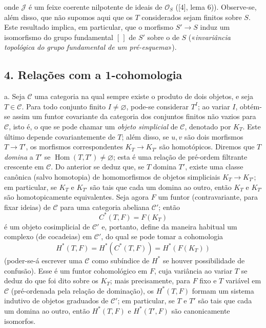 \documentclass[11pt,twoside,openany]{book}
\numberwithin{equation}{section}
\newcommand{\src}[1]{%
  \phantomsection\hypertarget{src:#1}{}%
  \marginpar{\raggedleft\footnotesize\sffamily #1}%
}
\theoremstyle{plain}
\theoremstyle{definition}
\theoremstyle{remark}
\newcommand{\FgaUnitKey}{frontmatter}
\renewcommand{\src}[1]{%
  \phantomsection\hypertarget{src:\FgaUnitKey:#1}{}%
  \marginpar{\raggedleft\footnotesize\sffamily #1}%
}
\begin{document}
\src{310}
onde $\mathcal J$ é um feixe coerente nilpotente de ideais de $\mathcal O_S$
([4], lema 6)). Observe-se, além disso, que não supomos aqui que os $T$
considerados sejam finitos sobre $S$. Este resultado implica, em particular,
que o morfismo $S'\longrightarrow S$ induz um isomorfismo do grupo
fundamental $[\,]$ de $S'$ sobre o de $S$ («\emph{invariância topológica do
grupo fundamental de um pré-esquema}»).

\subsection*{4. Relações com a 1-cohomologia}

\medskip\noindent
a. Seja $\mathcal C$ uma categoria na qual sempre existe o produto de dois
objetos, e seja $T\in\mathcal C$. Para todo conjunto finito
$I\ne\varnothing$, pode-se considerar $T^I$; ao variar $I$, obtém-se assim um
funtor covariante da categoria dos conjuntos finitos não vazios para
$\mathcal C$, isto é, o que se pode chamar um \emph{objeto simplicial} de
$\mathcal C$, denotado por $K_T$. Este último depende covariantemente de $T$;
além disso, se $u,v$ são dois morfismos $T\longrightarrow T'$, os morfismos
correspondentes $K_T\longrightarrow K_{T'}$ são homotópicos. Diremos que $T$
\emph{domina} a $T'$ se $\operatorname{Hom}(T,T')\ne\varnothing$; esta é uma
relação de pré-ordem filtrante crescente em $\mathcal C$. Do anterior se
deduz que, se $T$ domina $T'$, existe uma classe canônica (salvo homotopia)
de homomorfismos de objetos simpliciais $K_T\longrightarrow K_{T'}$; em
particular, se $K_T$ e $K_{T'}$ são tais que cada um domina ao outro, então
$K_T$ e $K_{T'}$ são homotopicamente equivalentes. Seja agora $F$ um funtor
(contravariante, para fixar ideias) de $\mathcal C$ para uma categoria abeliana
$\mathcal C'$; então
\[
  C^*(T,F)=F(K_T)
\]
é um objeto cosimplicial de $\mathcal C'$ e, portanto, define da maneira
habitual um complexo (de cocadeias) em $\mathcal C'$, do qual se pode tomar a
cohomologia
\[
  H^*(T,F)=H^*(C^*(T,F))=H^*(F(K_T))
\]
(poder-se-á escrever uma $\mathcal C$ como subíndice de $H^*$ se houver
possibilidade de confusão). Esse é um funtor cohomológico em $F$, cuja
variância ao variar $T$ se deduz do que foi dito sobre os $K_T$; mais
precisamente, para $F$ fixo e $T$ variável em $\mathcal C$ (pré-ordenada pela
relação de dominação), os $H^*(T,F)$ formam um sistema indutivo de objetos
graduados de $\mathcal C'$;
em particular, se $T$ e $T'$ são tais que cada um domina ao outro, então
$H^*(T,F)$ e $H^*(T',F)$ são canonicamente isomorfos.
\end{document}

